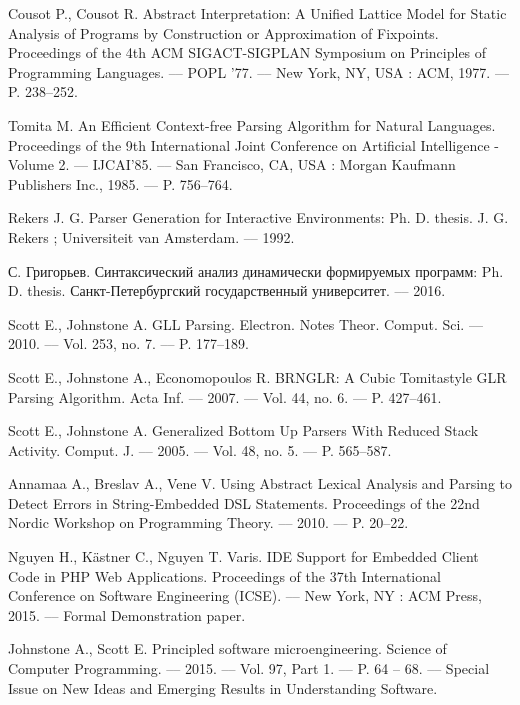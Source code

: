 \begin{thebibliography}{99}
  Cousot P., Cousot R. 
  Abstract Interpretation: A Unified Lattice Model for Static Analysis of Programs by Construction or Approximation of Fixpoints.
  Proceedings of the 4th ACM SIGACT-SIGPLAN Symposium on Principles of Programming Languages. –– POPL ’77. –– New York, NY, USA : ACM, 1977. –– P. 238–252. 

  Tomita M.
  An Efficient Context-free Parsing Algorithm for Natural Languages.
  Proceedings of the 9th International Joint Conference on Artificial Intelligence - Volume 2. –– IJCAI’85. –– San Francisco, CA, USA : Morgan Kaufmann Publishers Inc., 1985. –– P. 756–764. 

  Rekers J. G. 
  Parser Generation for Interactive Environments: Ph. D. thesis. 
  J. G. Rekers ; Universiteit van Amsterdam. –– 1992.

  С. Григорьев. 
  Синтаксический анализ динамически формируемых программ: Ph. D. thesis.
  Санкт-Петербургский государственный университет. –– 2016.

  Scott E., Johnstone A. 
  GLL Parsing. 
  Electron. Notes Theor. Comput. Sci. –– 2010. –– Vol. 253, no. 7. –– P. 177–189.

  Scott E., Johnstone A., Economopoulos R. 
  BRNGLR: A Cubic Tomitastyle GLR Parsing Algorithm. 
  Acta Inf. –– 2007. –– Vol. 44, no. 6. –– P. 427–461.

  Scott E., Johnstone A. 
  Generalized Bottom Up Parsers With Reduced Stack Activity.
  Comput. J. –– 2005. –– Vol. 48, no. 5. –– P. 565–587.

  Annamaa A., Breslav A., Vene V. 
  Using Abstract Lexical Analysis and Parsing to Detect Errors in String-Embedded DSL Statements. 
  Proceedings of the 22nd Nordic Workshop on Programming Theory. –– 2010. –– P. 20–22.
               
  Nguyen H., K{\"a}stner C., Nguyen T. Varis.
  IDE Support for Embedded Client Code in PHP Web Applications.
  Proceedings of the 37th International Conference on Software Engineering (ICSE). –– New York, NY : ACM Press, 2015. –– Formal Demonstration paper.

  Johnstone A., Scott E.
  Principled software microengineering.
  Science of Computer Programming. –– 2015. –– Vol. 97, Part 1. –– P. 64 – 68. –– Special Issue on New Ideas and Emerging Results in Understanding Software. 


\end{thebibliography}
